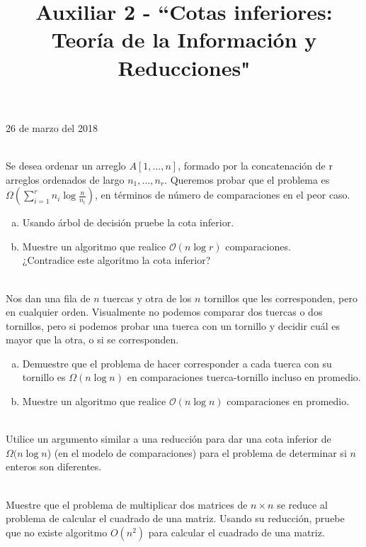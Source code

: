 \documentclass[dcc,uchile]{fcfmcourse}
\title{Auxiliar 2 - ``Cotas inferiores: Teoría de la Información y Reducciones"}
\theoremstyle{plain}
\theoremstyle{definition}
\begin{document}
\maketitle
\begin{center}
26 de marzo del 2018
\end{center}


\vspace{-1ex}


\begin{problems}
\\
Se desea ordenar un arreglo $A[1, \ldots, n]$, formado por la concatenación de r arreglos ordenados de largo $n_1, \ldots, n_r$. Queremos probar que el problema es  $\Omega \left( \sum_{i = 1}^r{n_i\log{\frac{n}{n_{i}}}} \right)$,  en términos de número de comparaciones en el peor caso.

\begin{enumerate}[a)]
    \item Usando árbol de decisión pruebe la cota inferior.
    \item Muestre un algoritmo que realice $\mathcal{O}(n\log{r})$ comparaciones.\\ ¿Contradice este algoritmo la cota inferior?
\end{enumerate}

\\
Nos dan una fila de $n$ tuercas y otra de los $n$ tornillos que les corresponden, pero en cualquier orden. Visualmente no podemos comparar dos tuercas o dos tornillos, pero si podemos probar una
tuerca con un tornillo y decidir cuál es mayor que la otra, o si se corresponden.

\begin{enumerate}[a)]
    \item Demuestre que el problema de hacer corresponder a cada tuerca con su tornillo es $\Omega (n \log n)$ en comparaciones tuerca-tornillo incluso en promedio.
    \item Muestre un algoritmo que realice $\mathcal{O}(n\log{n})$ comparaciones en promedio.
\end{enumerate}


\\
 Utilice un argumento similar a una reducción para dar una cota inferior de
$\Omega (n\log n$) (en el modelo de comparaciones) para el problema de determinar si $n$ enteros son diferentes.

\\
 Muestre que el problema de multiplicar dos matrices de $n \times n$ se reduce al problema de calcular el cuadrado de una matriz. Usando su reducción, pruebe que no existe algoritmo $O(n^2)$ para calcular el cuadrado de una matriz.

\end{problems}
\end{document}
